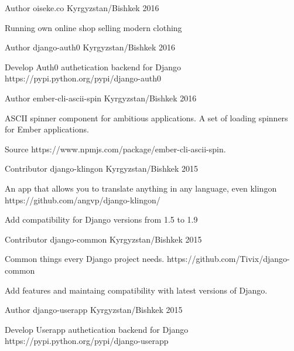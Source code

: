 \begin{cventries}
  \cventry
    {Author}
    {oiseke.co}
    {Kyrgyzstan/Bishkek}
    {2016}
    {
      \begin{cvitems}
        \item {Running own online shop selling modern clothing}
      \end{cvitems}
    }
  \cventry
    {Author}
    {django-auth0}
    {Kyrgyzstan/Bishkek}
    {2016}
    {
      \begin{cvitems}
        \item {Develop Auth0 authetication backend for Django https://pypi.python.org/pypi/django-auth0}
      \end{cvitems}
    }
  \cventry
    {Author}
    {ember-cli-ascii-spin}
    {Kyrgyzstan/Bishkek}
    {2016}
    {
      \begin{cvitems}
        \item {ASCII spinner component for ambitious applications. A set of loading spinners for Ember applications.}
        \item {Source https://www.npmjs.com/package/ember-cli-ascii-spin.}
      \end{cvitems}
    }
  \cventry
    {Contributor}
    {django-klingon}
    {Kyrgyzstan/Bishkek}
    {2015}
    {
      \begin{cvitems}
        \item {An app that allows you to translate anything in any language, even klingon https://github.com/angvp/django-klingon/}
        \item {Add compatibility for Django versions from 1.5 to 1.9}
      \end{cvitems}
    }
  \cventry
    {Contributor}
    {django-common}
    {Kyrgyzstan/Bishkek}
    {2015}
    {
      \begin{cvitems}
        \item {Common things every Django project needs. https://github.com/Tivix/django-common}
        \item {Add features and maintaing compatibility with latest versions of Django.}
      \end{cvitems}
    }
  \cventry
    {Author}
    {django-userapp}
    {Kyrgyzstan/Bishkek}
    {2015}
    {
      \begin{cvitems}
        \item {Develop Userapp authetication backend for Django https://pypi.python.org/pypi/django-userapp}
      \end{cvitems}
}
\end{cventries}
